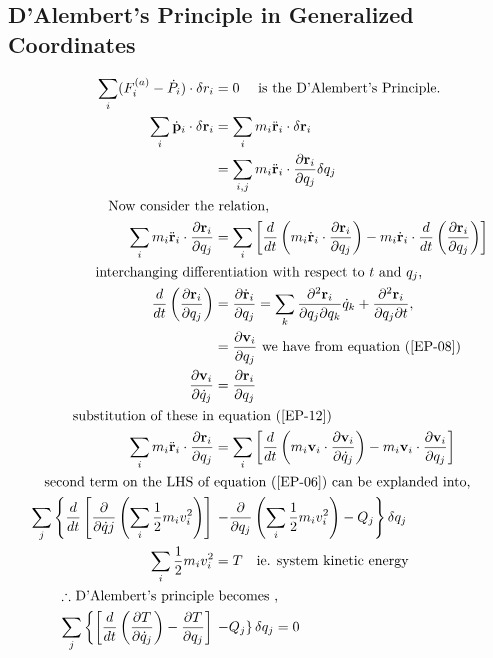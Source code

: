 \subsection{D'Alembert's Principle in Generalized Coordinates}
\begin{align}
\sum\limits_{i}(F_i^{(a)}-\dot{P}_i)\cdot\delta r_i&=0\text{ \quad is the D'Alembert's Principle.}\notag\\
\sum_{i} \dot{\mathbf{p}}_{i} \cdot \delta \mathbf{r}_{i}&=\sum_{i} m_{i} \ddot{\mathbf{r}}_{i} \cdot \delta \mathbf{r}_{i}\notag\\
&=\sum_{i, j} m_{i} \ddot{\mathbf{r}}_{i} \cdot \frac{\partial \mathbf{r}_{i}}{\partial q_{j}} \delta q_{j}\notag\\
\text{Now consider the}&\text{ relation,}\notag\\
\sum_{i} m_{i} \ddot{\mathbf{r}}_{i} \cdot \frac{\partial \mathbf{r}_{i}}{\partial q_{j}}&=\sum_{i}\left[\frac{d}{d t}\left(m_{i} \dot{\mathbf{r}}_{i} \cdot \frac{\partial \mathbf{r}_{i}}{\partial q_{j}}\right)-m_{i} \dot{\mathbf{r}}_{i} \cdot \frac{d}{d t}\left(\frac{\partial \mathbf{r}_{i}}{\partial q_{j}}\right)\right]\label{EP-12}\\
\text{interchanging differ}&\text{entiation with respect to $t$ and $q_j$,}\notag\\
 \frac{d}{d t}\left(\frac{\partial \mathbf{r}_{i}}{\partial q_{j}}\right) &=\frac{\partial \dot{\mathbf{r}}_{i}}{\partial q_{j}}=\sum_{k} \frac{\partial^{2} \mathbf{r}_{i}}{\partial q_{j} \partial q_{k}} \dot{q}_{k}+\frac{\partial^{2} \mathbf{r}_{i}}{\partial q_{j} \partial t}, \notag\\
&=\frac{\partial \mathbf{v}_{i}}{\partial q_{j}}
\text{ we have from equation }(\ref{EP-08})\notag\\
\frac{\partial \mathbf{v}_{i}}{\partial \dot{q}_{j}}&=\frac{\partial \mathbf{r}_{i}}{\partial q_{j}}\label{EP-13}\\
\text{substitution of these in}&\text{ equation (\ref{EP-12})}\notag\\
\sum_{i} m_{i} \ddot{\mathbf{r}}_{i} \cdot \frac{\partial \mathbf{r}_{i}}{\partial q_{j}}&=\sum_{i}\left[\frac{d}{d t}\left(m_{i} \mathbf{v}_{i} \cdot \frac{\partial \mathbf{v}_{i}}{\partial \dot{q}_{j}}\right)-m_{i} \mathbf{v}_{i} \cdot \frac{\partial \mathbf{v}_{i}}{\partial q_{j}}\right]\notag\\
\text{second term on the LHS of }&\text{equation (\ref{EP-06}) can be explanded into,}\notag\\
\sum_{j}\left\{\frac{d}{d t}\left[\frac{\partial}{\partial \dot{q} j}\left(\sum_{i} \frac{1}{2} m_{i} v_{i}^{2}\right)\right]\right. &\left. -\frac{\partial}{\partial q_{j}}\left(\sum_{i} \frac{1}{2} m_{i} v_{i}^{2}\right)-Q_{j}\right\} \delta q_{j}\notag\\
\sum_{i} \frac{1}{2} m_{i} v_{i}^{2}&=T\quad \text{ie. system kinetic energy}\notag\\
\text{$\therefore$ D'Alembert's principle}&\text{ becomes ,}\notag\\
\sum_{j}\left\{\left[\frac{d}{d t}\left(\frac{\partial T}{\partial \dot{q}_{j}}\right)-\frac{\partial T}{\partial q_{j}}\right]\right.& \left. -Q_{j}\right\} \delta q_{j}=0\label{EP-14}
\end{align}
